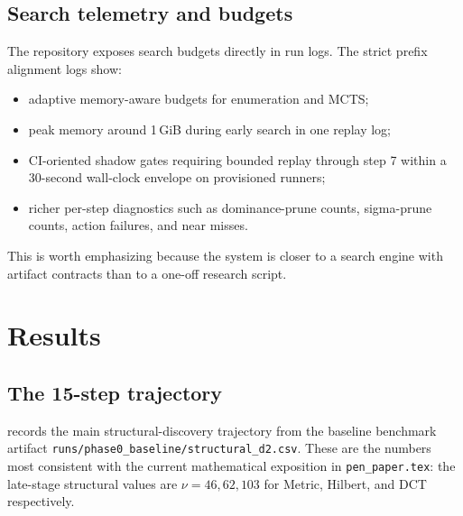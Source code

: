 \documentclass[11pt,a4paper]{article}
\begin{document}
\subsection{Search telemetry and budgets}

The repository exposes search budgets directly in run logs. The strict prefix alignment logs show:
\begin{itemize}[nosep]
  \item adaptive memory-aware budgets for enumeration and MCTS;
  \item peak memory around 1\,GiB during early search in one replay log;
  \item CI-oriented shadow gates requiring bounded replay through step 7 within a 30-second wall-clock envelope on provisioned runners;
  \item richer per-step diagnostics such as dominance-prune counts, sigma-prune counts, action failures, and near misses.
\end{itemize}
This is worth emphasizing because the system is closer to a search engine with artifact contracts than to a one-off research script.

\section{Results}
\label{sec:results}

\subsection{The 15-step trajectory}

 records the main structural-discovery trajectory from the baseline benchmark artifact \texttt{runs/phase0\_baseline/structural\_d2.csv}. These are the numbers most consistent with the current mathematical exposition in \texttt{pen\_paper.tex}: the late-stage structural values are $\nu=46,62,103$ for Metric, Hilbert, and DCT respectively.
\end{document}
